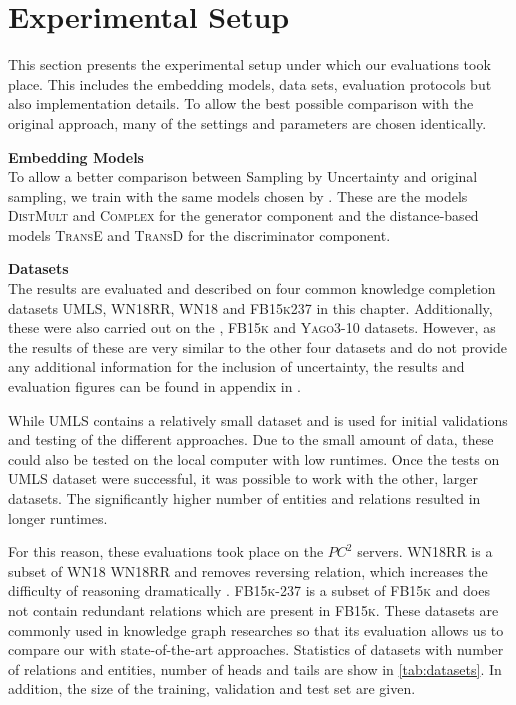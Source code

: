 \section{Experimental Setup}
\label{ch:evaluation:sec:experimental_setup}
%
This section presents the experimental setup under which our evaluations took place.
This includes the embedding models, data sets, evaluation protocols but also implementation details.
To allow the best possible comparison with the original \kbgan approach, many of the settings and parameters are chosen identically.

\textbf{Embedding Models}\\
To allow a better comparison between Sampling by Uncertainty and original sampling, we train with the same models chosen by \kbgan.
These are the models \textsc{DistMult} and \textsc{Complex} for the generator component and the distance-based models \textsc{TransE} and \textsc{TransD} for the discriminator component.

\textbf{Datasets}\\
The results are evaluated and described on four common knowledge completion datasets  \textsc{UMLS}, \textsc{WN18RR}, \textsc{WN18} 
and \textsc{FB15k237} in this chapter.
Additionally, these were also carried out on the \kinship, \textsc{FB15k} and \textsc{Yago3-10} datasets.
However, as the results of these are very similar to the other four datasets and do not provide any additional information for the inclusion of uncertainty, the results and evaluation figures can be found in appendix in .

While \textsc{UMLS} contains a relatively small dataset and is used for initial validations and testing of the different approaches.
Due to the small amount of data, these could also be tested on the local computer with low runtimes.
Once the tests on \textsc{UMLS} dataset were successful, it was possible to work with the other, larger datasets.
The significantly higher number of entities and relations resulted in longer runtimes.

For this reason, these evaluations took place on the $PC^2$ servers.
\textsc{WN18RR} is a subset of \textsc{WN18} \textsc{WN18RR} and removes reversing relation, which increases the difficulty of reasoning dramatically \cite{cai2017kbgan}.
\textsc{FB15k-237} is a subset of \textsc{FB15k} and does not contain redundant relations which are present in \textsc{FB15k}.
These datasets are commonly used in knowledge graph researches so that its evaluation allows us to compare our with state-of-the-art approaches.
Statistics of datasets with number of relations and entities, number of heads and tails are show in \autoref{tab:datasets}. 
In addition, the size of the training, validation and test set are given.
        
